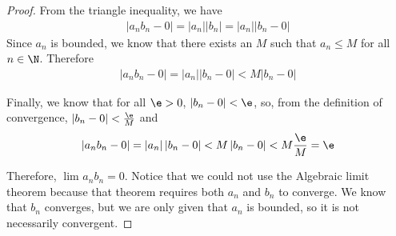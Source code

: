 \begin{proof}
	From the triangle inequality, we have
	\begin{align}
		\left|a_n b_n - 0\right| = \left|a_n\right| \left|b_n\right| = \left|a_n\right| \left|b_n - 0\right|
	\end{align}
	Since $a_n$ is bounded, we know that there exists an $M$ such that $a_n \le M$ for all $n \in \N$. Therefore
	\begin{align}
		\left|a_n b_n - 0\right| = \left|a_n\right|\left|b_n - 0\right| < M \left|b_n - 0\right|
	\end{align}

	Finally, we know that for all $\e > 0$,  $\left|b_n - 0\right| < \e$, so, from the definition of convergence, $\left|b_n - 0\right| < \frac{\e}{M}$ and
	\begin{align}
		\left|a_n b_n - 0\right| = \left|a_n\right|\left|b_n - 0\right| < M \left|b_n - 0\right| < M \frac{\e}{M} = \e
	\end{align}

	Therefore, $\lim_{} a_n b_n = 0$. Notice that we could not use the Algebraic limit theorem because that theorem requires both $a_n$ and $b_n$ to converge. We know that $b_n$ converges, but we are only given that $a_n$ is bounded, so it is not necessarily convergent.
\end{proof}









